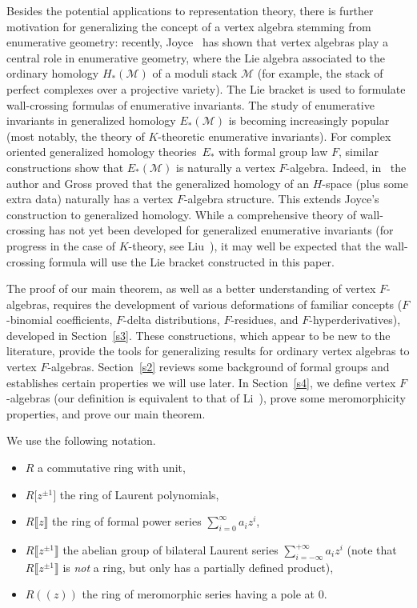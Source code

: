 \documentclass[10pt,a4paper]{amsart}
\numberwithin{equation}{section}
\theoremstyle{definition}
\def\lb{\llbracket}
\def\rb{\rrbracket}
\begin{document}
Besides the potential applications to representation theory, there is further motivation for generalizing the concept of a vertex algebra stemming from enumerative geometry: recently, Joyce~\cite{Joy2,Joy} has shown that vertex algebras play a central role in enumerative geometry, where the Lie algebra associated to the ordinary homology $H_*(\mathcal{M})$ of a moduli stack $\mathcal{M}$ (for example, the stack of perfect complexes over a projective variety). The Lie bracket is used to formulate wall-crossing formulas of enumerative invariants. The study of enumerative invariants in generalized homology $E_*(\mathcal{M})$ is becoming increasingly popular (most notably, the theory of $K$-theoretic enumerative invariants). For complex oriented generalized homology theories~$E_*$ with formal group law $F$, similar constructions show that $E_*(\mathcal{M})$ is naturally a vertex $F$-algebra. Indeed, in~\cite{GroUp} the author and Gross proved that the generalized homology of an $H$-space (plus some extra data) naturally has a vertex $F$-algebra structure. This extends Joyce's construction to generalized homology. While a comprehensive theory of wall-crossing has not yet been developed for generalized enumerative invariants (for progress in the case of $K$-theory, see Liu~\cite{Liu}), it may well be expected that the wall-crossing formula will use the Lie bracket constructed in this paper.

The proof of our main theorem, as well as a better understanding of vertex $F$-algebras, requires the development of various deformations of familiar concepts ($F$-binomial coefficients, $F$-delta distributions, $F$-residues, and $F$-hyperderivatives), developed in Section~\ref{s3}. These constructions, which appear to be new to the literature, provide the tools for generalizing results for ordinary vertex algebras to vertex $F$-algebras. Section~\ref{s2} reviews some background of formal groups and establishes certain properties we will use later. In Section~\ref{s4}, we define vertex $F$-algebras (our definition is equivalent to that of Li~\cite{Li}), prove some meromorphicity properties, and prove our main theorem.

We use the following notation.
\begin{itemize}\itemsep=0pt
\item
$R$ a commutative ring with unit,
\item
$R\big[z^{\pm1}\big]$ the ring of Laurent polynomials,
\item
$R\lb z\rb$ the ring of formal power series $\sum_{i=0}^\infty a_i z^i$,
\item
$R\big\lb z^{\pm1}\big\rb$ the abelian group of bilateral Laurent series $\sum_{i=-\infty}^{+\infty} a_i z^i$ (note that $R\big\lb z^{\pm1}\big\rb$ is \emph{not} a ring, but only has a partially defined product),
\item
$R(\!( z)\!)$ the ring of meromorphic series having a pole at $0$.
\end{itemize}
\end{document}
